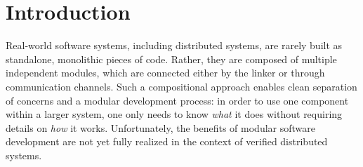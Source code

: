 \newcommand{\nstep}[2]{\mathrel{\oset{#2}{~\leadsto_{#1}~}}}
\newcommand{\nsem}[4]{{#3}\mathrel{\overset{#2}{\leadsto_{#1}}}{#4}}
\newcommand{\ninf}[4]{{#3}\mathrel{\oset{\!\!\!\neg{#2}*}{\leadsto_{#1}}}{#4}}
\newcommand{\nsemw}[4]{{#3}\mathrel{\oset{w, #2}{\leadsto_{#1}}}{#4}}


\newcommand{\tprep}{\mathsf{Prepare}}
\newcommand{\tyes}{\mathsf{Yes}}
\newcommand{\tno}{\mathsf{No}}
\newcommand{\tcommit}{\mathsf{Commit}}
\newcommand{\tabort}{\mathsf{Abort}}
\newcommand{\tackcommit}{\mathsf{AckCommit}}
\newcommand{\tackabort}{\mathsf{AckAbort}}

\newcommand{\cn}{\mathsf{Coord}}
\newcommand{\pts}{\overline{P}}
\newcommand{\pt}{\mathtt{pt}}


\newcommand{\round}{\mathit{r}}
\newcommand{\tpclog}{\mathit{log}}
\newcommand{\data}{\mathit{data}}

\newcommand{\stat}{\kappa}
\newcommand{\done}{\mathsf{done}}
\newcommand{\tagi}{\mathit{tag}}
\newcommand{\prei}{\mathit{pre}}
\newcommand{\stepi}{\mathit{step}}

\newcommand{\pinit}{\mathsf{PInit}}
\newcommand{\pgotreq}{\mathsf{PGotRequest}}
\newcommand{\pyes}{\mathsf{PRespYes}}
\newcommand{\pno}{\mathsf{PRespNo}}
\newcommand{\pcommit}{\mathsf{PCommit}}
\newcommand{\pabort}{\mathsf{PAbort}}

\newcommand{\cinit}{\mathsf{CInit}}
\newcommand{\csendprep}{\mathsf{CSendPrep}}
\newcommand{\cwaitprep}{\mathsf{CWaitPrepResp}}
\newcommand{\csendcommit}{\mathsf{CSendCommit}}
\newcommand{\csendabort}{\mathsf{CSendAbort}}
\newcommand{\cwaitcommit}{\mathsf{CWaitCommitAck}}
\newcommand{\cwaitabort}{\mathsf{CWaitAbortAck}}

\newcommand{\spa}{\phantom{zz}}
\newcommand{\spb}{\phantom{zzzz}}
\newcommand{\code}[1]{\lstinline[style=Coq, basicstyle=\small\ttfamily]{#1}}
\newcommand{\fld}{\#}

\newcommand{\SendEffect}{\mathsf{Sent}}
\newcommand{\ReceiveEffect}{\mathsf{Received}}


\section{Introduction}
\label{sec:intro}

Real-world software systems, including distributed systems, are rarely
built as standalone, monolithic pieces of code.
%
Rather, they are composed of multiple independent modules, which are
connected either by the linker or through communication channels.
%
Such a compositional approach enables clean separation of concerns and
a modular development process: in order to use one component within a
larger system, one only needs to know \emph{what} it does without
requiring details on \emph{how} it works.
%
Unfortunately, the benefits of modular software development are not
yet fully realized in the context of verified distributed systems.


